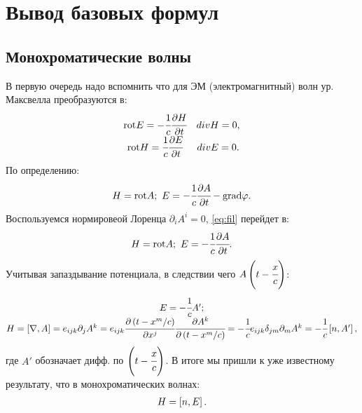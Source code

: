 \section{Вывод базовых формул}
\subsection{Монохроматические волны}
В первую очередь надо вспомнить что для ЭМ (электромагнитный) волн 
ур. Максвелла преобразуются в:
\begin{gather}
    \begin{matrix}
        \text{rot} E = -\cfrac{1}{c} \cfrac{\partial H}{\partial t} & div H = 0, \\
        \text{rot} H = \cfrac{1}{c} \cfrac{\partial E}{\partial t} & div E = 0.
    \end{matrix}
\end{gather} 
По определению:
\begin{eqnarray}
    H = \rot A; \ 
    E = -\cfrac{1}{c}\cfrac{\partial A}{\partial t} - \grad \phi .
    \label{eq:fil}
\end{eqnarray} 
Воспользуемся нормировеой Лоренца $\partial_i A^i = 0$, \ref{eq:fil} перейдет в:
\begin{eqnarray}
    H = \text{rot} A; \ E = -\cfrac{1}{c}\cfrac{\partial A}{\partial t}.
\end{eqnarray} 
Учитывая запаздывание потенциала, в следствии чего $A\left( t - \cfrac{x}{c} \right)$:
\begin{gather}
    \begin{matrix}
    E = -\cfrac{1}{c} A' ; \\ 
    H = \left[ \nabla, A \right] = e_{ijk} \partial_j A^k = 
    e_{ijk} \cfrac{\partial \left( t - x^m /c \right)}{\partial x^j}  
    \cfrac{\partial A^k}{\partial \left( t - x^m /c \right)} =
    -\cfrac{1}{c}e_{ijk} \delta_{jm} \partial_{m} A^k = 
    -\cfrac{1}{c}\left[ n, A' \right],
    \end{matrix}
    \label{eq:H_A}
\end{gather}
где $A'$ обозначает дифф. по $\left( t - \cfrac{x}{c} \right)$. 
В итоге мы пришли к уже известному результату, что в 
монохроматических волнах:
\begin{eqnarray}
    H = \left[ n, E \right].
\end{eqnarray} 

